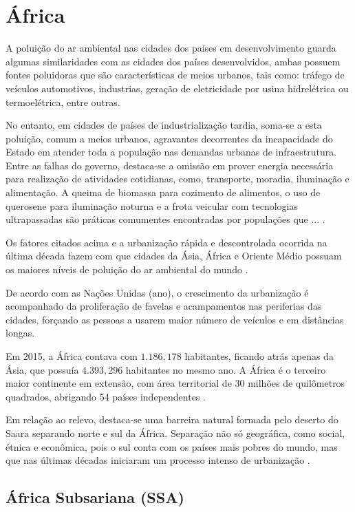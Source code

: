 \section{África}

A poluição do ar ambiental nas cidades dos países em desenvolvimento
guarda algumas similaridades com as cidades dos países desenvolvidos,
ambas possuem fontes poluidoras que são características de meios urbanos, 
tais como: tráfego de veículos automotivos, industrias, geração de 
eletricidade por usina hidrelétrica ou termoelétrica, entre outras. 

No entanto, em cidades de países de industrialização tardia, soma-se a esta 
poluição, comum a meios urbanos, agravantes decorrentes da incapacidade do 
Estado em atender toda a população nas demandas urbanas de infraestrutura. 
Entre as falhas do governo, destaca-se a omissão em prover energia 
necessária para realização de atividades cotidianas, como, transporte, 
moradia, iluminação e alimentação. 
A queima de biomassa para cozimento de alimentos, o uso de querosene para 
iluminação noturna e a frota veicular com tecnologias ultrapassadas são práticas
comumentes encontradas por populações que  ...
\citep{brauer2012}.

Os fatores citados acima e a urbanização rápida e descontrolada ocorrida na
última década fazem com que cidades da Ásia, África e Oriente 
Médio possuam os maiores níveis de poluição do ar ambiental do mundo 
\citep{brauer2012}.

De acordo com as Nações Unidas (ano), o crescimento da urbanização é acompanhado 
da proliferação de favelas e acampamentos nas periferias das cidades, forçando
as pessoas a usarem maior número de veículos e em distâncias longas.  

Em 2015, a África contava com $1.186,178$ habitantes, ficando atrás 
apenas da Ásia, que possuía $4.393,296$ habitantes no mesmo ano. 
A África é o terceiro maior continente em extensão, com área territorial 
de 30 milhões de quilômetros quadrados, abrigando 54 países independentes 
\citep{UN}.

Em relação ao relevo, destaca-se uma barreira natural formada pelo deserto do 
Saara separando norte e sul da África. Separação não só geográfica, como
social, étnica e econômica, pois o sul conta com os países mais pobres do mundo, 
mas que nas últimas décadas iniciaram um processo intenso de urbanização 
\citep{UN}. 
   	
\subsection{África Subsariana (SSA)}

